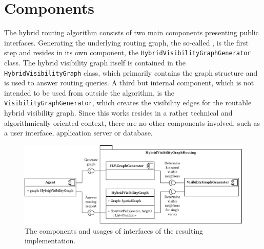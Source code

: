 \section{Components}
\label{sec:components}

	The hybrid routing algorithm consists of two main components presenting public interfaces.
	Generating the underlying routing graph, the so-called , is the first step and resides in its own component, the \texttt{HybridVisibilityGraphGenerator} class.
	The hybrid visibility graph itself is contained in the \texttt{HybridVisibilityGraph} class, which primarily contains the graph structure and is used to answer routing queries.
	A third but internal component, which is not intended to be used from outside the algorithm, is the \texttt{VisibilityGraphGenerator}, which creates the visibility edges for the routable hybrid visibility graph.
	Since this works resides in a rather technical and algorithmically oriented context, there are no other components involved, such as a user interface, application server or database.
	
	\begin{figure}[h]
		\begin{figcenter}
			\includegraphics[scale=0.8]{images/components.pdf}
		\end{figcenter}
		\caption[Component diagram of the hybrid visibility graph implementation.]{The components and usages of interfaces of the resulting implementation.}
		\label{fig:components}
	\end{figure}
	
